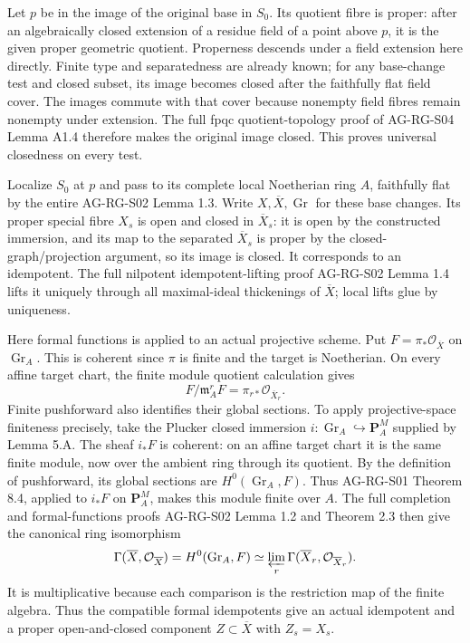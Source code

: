 \documentclass[11pt,a4paper,openany]{report}
\newcounter{none}
\begin{document}
Let \(p\) be in the image of the original base in \(S_0\). Its quotient fibre is proper: after an algebraically closed extension of a residue field of a point above \(p\), it is the given proper geometric quotient. Properness descends under a field extension here directly. Finite type and separatedness are already known; for any base-change test and closed subset, its image becomes closed after the faithfully flat field cover. The images commute with that cover because nonempty field fibres remain nonempty under extension. The full fpqc quotient-topology proof of AG-RG-S04 Lemma A1.4 therefore makes the original image closed. This proves universal closedness on every test.

Localize \(S_0\) at \(p\) and pass to its complete local Noetherian ring \(A\), faithfully flat by the entire AG-RG-S02 Lemma 1.3. Write \(X,\overline X,\operatorname{Gr}\) for these base changes. Its proper special fibre \(X_s\) is open and closed in \(\overline X_s\): it is open by the constructed immersion, and its map to the separated \(\overline X_s\) is proper by the closed-graph/projection argument, so its image is closed. It corresponds to an idempotent. The full nilpotent idempotent-lifting proof AG-RG-S02 Lemma 1.4 lifts it uniquely through all maximal-ideal thickenings of \(\overline X\); local lifts glue by uniqueness.

Here formal functions is applied to an actual projective scheme. Put \(F=\pi_*\mathcal O_{\overline X}\) on \(\operatorname{Gr}_A\). This is coherent since \(\pi\) is finite and the target is Noetherian. On every affine target chart, the finite module quotient calculation gives \[
 F/\mathfrak m_A^rF=\pi_{r*}\mathcal O_{\overline X_r}.
\] Finite pushforward also identifies their global sections. To apply projective-space finiteness precisely, take the Plucker closed immersion \(i:\operatorname{Gr}_A\hookrightarrow\mathbf P_A^M\) supplied by Lemma 5.A. The sheaf \(i_*F\) is coherent: on an affine target chart it is the same finite module, now over the ambient ring through its quotient. By the definition of pushforward, its global sections are \(H^0(\operatorname{Gr}_A,F)\). Thus AG-RG-S01 Theorem 8.4, applied to \(i_*F\) on \(\mathbf P_A^M\), makes this module finite over \(A\). The full completion and formal-functions proofs AG-RG-S02 Lemma 1.2 and Theorem 2.3 then give the canonical ring isomorphism \[
 \Gamma(\overline X,\mathcal O_{\overline X})
   =H^0(\operatorname{Gr}_A,F)
   \simeq\varprojlim_r\Gamma(\overline X_r,\mathcal O_{\overline X_r}).
\] It is multiplicative because each comparison is the restriction map of the finite algebra. Thus the compatible formal idempotents give an actual idempotent and a proper open-and-closed component \(Z\subset\overline X\) with \(Z_s=X_s\).
\end{document}
